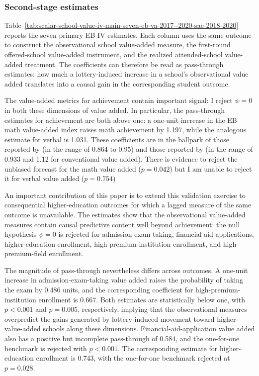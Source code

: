 \documentclass[a4paper, article, english, oneside, unknownkeysallowed, 12pt]{memoir}
\begin{document}
\subsubsection{Second-stage estimates}

Table~\ref{tab:scalar-school-value-iv-main-seven-eb-va-2017--2020-sae-2018-2020} reports the seven primary EB IV estimates.
Each column uses the same outcome to construct the observational school value-added measure, the first-round offered-school value-added instrument, and the realized attended-school value-added treatment.
The coefficients can therefore be read as pass-through estimates: how much a lottery-induced increase in a school's observational value added translates into a causal gain in the corresponding student outcome.



The value-added metrics for achievement contain important signal: I reject $\psi = 0$ in both these dimensions of value added.
In particular, the pass-through estimates for achievement are both above one: a one-unit increase in the EB math value-added index raises math achievement by 1.197, while the analogous estimate for verbal is 1.031.
These coefficients are in the ballpark of those reported by \textcite{angrist_leveraging_2017} (in the range of 0.864 to 0.95) and those reported by \textcite{angrist_credible_2024} (in the range of 0.933 and 1.12 for conventional value added).
There is evidence to reject the unbiased forecast for the math value added ($p = 0.042$) but I am unable to reject it for verbal value added  ($p = 0.754$)

An important contribution of this paper is to extend this validation exercise to consequential higher-education outcomes for which a lagged measure of the same outcome is unavailable.
The estimates show that the observational value-added measures contain causal predictive content well beyond achievement: the null hypothesis $\psi=0$ is rejected for admission-exam taking, financial-aid applications, higher-education enrollment, high-premium-institution enrollment, and high-premium-field enrollment.

The magnitude of pass-through nevertheless differs across outcomes.
A one-unit increase in admission-exam-taking value added raises the probability of taking the exam by 0.486 units, and the corresponding coefficient for high-premium-institution enrollment is 0.667.
Both estimates are statistically below one, with $p<0.001$ and $p=0.005$, respectively, implying that the observational measures overpredict the gains generated by lottery-induced movement toward higher-value-added schools along these dimensions.
Financial-aid-application value added also has a positive but incomplete pass-through of 0.584, and the one-for-one benchmark is rejected with $p<0.001$. The corresponding estimate for higher-education enrollment is 0.743, with the one-for-one benchmark rejected at $p=0.028$.
\end{document}

